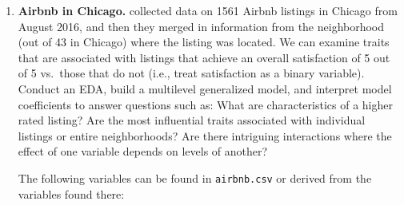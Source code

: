 \documentclass[
]{krantz}
\begin{document}
\begin{enumerate}
\def\labelenumi{\arabic{enumi}.}
\item
  \textbf{Airbnb in Chicago.} \citet{Trinh2018} collected data on 1561 Airbnb listings in Chicago from August 2016, and then they merged in information from the neighborhood (out of 43 in Chicago) where the listing was located. We can examine traits that are associated with listings that achieve an overall satisfaction of 5 out of 5 vs.~those that do not (i.e., treat satisfaction as a binary variable). Conduct an EDA, build a multilevel generalized model, and interpret model coefficients to answer questions such as: What are characteristics of a higher rated listing? Are the most influential traits associated with individual listings or entire neighborhoods? Are there intriguing interactions where the effect of one variable depends on levels of another?

  The following variables can be found in \texttt{airbnb.csv} or derived from the variables found there:


\end{enumerate}
\end{document}
